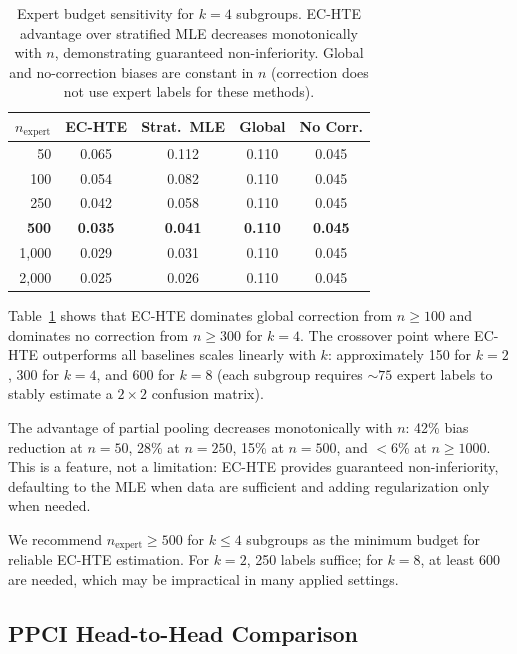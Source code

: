 \documentclass[11pt,a4paper]{article}
\begin{document}
\begin{table}[t]
\centering
\small
\caption{Expert budget sensitivity for $k = 4$ subgroups. EC-HTE advantage over stratified MLE decreases monotonically with $n$, demonstrating guaranteed non-inferiority. Global and no-correction biases are constant in $n$ (correction does not use expert labels for these methods).}
\label{tab:budget}
\begin{tabular}{rcccc}
\toprule
$n_{\text{expert}}$ & EC-HTE & Strat.\ MLE & Global & No Corr. \\
\midrule
50 & 0.065 & 0.112 & 0.110 & 0.045 \\
100 & 0.054 & 0.082 & 0.110 & 0.045 \\
250 & 0.042 & 0.058 & 0.110 & 0.045 \\
\textbf{500} & \textbf{0.035} & \textbf{0.041} & \textbf{0.110} & \textbf{0.045} \\
1{,}000 & 0.029 & 0.031 & 0.110 & 0.045 \\
2{,}000 & 0.025 & 0.026 & 0.110 & 0.045 \\
\bottomrule
\end{tabular}
\end{table}

Table~\ref{tab:budget} shows that EC-HTE dominates global correction from $n \geq 100$ and dominates no correction from $n \geq 300$ for $k = 4$.
The crossover point where EC-HTE outperforms all baselines scales linearly with $k$: approximately 150 for $k = 2$, 300 for $k = 4$, and 600 for $k = 8$ (each subgroup requires ${\sim}75$ expert labels to stably estimate a $2 \times 2$ confusion matrix).

The advantage of partial pooling decreases monotonically with $n$: 42\% bias reduction at $n = 50$, 28\% at $n = 250$, 15\% at $n = 500$, and $<$6\% at $n \geq 1000$.
This is a feature, not a limitation: EC-HTE provides guaranteed non-inferiority, defaulting to the MLE when data are sufficient and adding regularization only when needed.

We recommend $n_{\text{expert}} \geq 500$ for $k \leq 4$ subgroups as the minimum budget for reliable EC-HTE estimation.
For $k = 2$, 250 labels suffice; for $k = 8$, at least 600 are needed, which may be impractical in many applied settings.

\subsection{PPCI Head-to-Head Comparison}
\label{sec:ppci}
\end{document}
